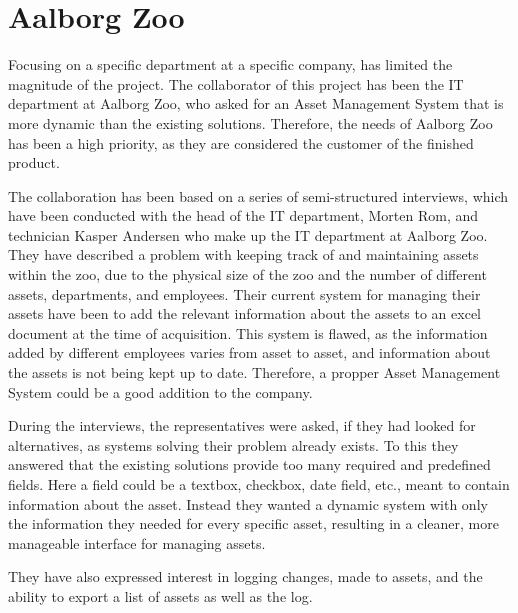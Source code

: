 \section{Aalborg Zoo}\label{ch:problemdefinition}
Focusing on a specific department at a specific company, has limited the magnitude of the project. The collaborator of this project has been the IT department at Aalborg Zoo, who asked for an Asset Management System that is more dynamic than the existing solutions. Therefore, the needs of Aalborg Zoo has been a high priority, as they are considered the customer of the finished product.
\par
The collaboration has been based on a series of semi-structured interviews, which have been conducted with the head of the IT department, Morten Rom, and technician Kasper Andersen who make up the IT department at Aalborg Zoo. They have described a problem with keeping track of and maintaining assets within the zoo, due to the physical size of the zoo and the number of different assets, departments, and employees. Their current system for managing their assets have been to add the relevant information about the assets to an excel document at the time of acquisition. This system is flawed, as the information added by different employees varies from asset to asset, and information about the assets is not being kept up to date. Therefore, a propper Asset Management System could be a good addition to the company.
\par
During the interviews, the representatives were asked, if they had looked for alternatives, as systems solving their problem already exists. To this they answered that the existing solutions provide too many required and predefined fields. Here a field could be a textbox, checkbox, date field, etc., meant to contain information about the asset. Instead they wanted a dynamic system with only the information they needed for every specific asset, resulting in a cleaner, more manageable interface for managing assets.
\par
They have also expressed interest in logging changes, made to assets, and the ability to export a list of assets as well as the log. 




